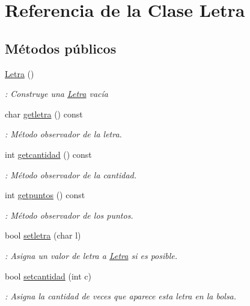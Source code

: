 \hypertarget{classLetra}{}\section{Referencia de la Clase Letra}
\label{classLetra}
\subsection*{Métodos públicos}
\begin{DoxyCompactItemize}
\item 
\hyperlink{classLetra_a2e236c67e3630258c6d3d9f2a9e66709}{Letra} ()\hypertarget{classLetra_a2e236c67e3630258c6d3d9f2a9e66709}{}\label{classLetra_a2e236c67e3630258c6d3d9f2a9e66709}

\begin{DoxyCompactList}\small\item\em \+: Construye una \hyperlink{classLetra}{Letra} vacía \end{DoxyCompactList}\item 
char \hyperlink{classLetra_a94a87e5d27e65cbc29c9e3b9ec25c2ef}{getletra} () const 
\begin{DoxyCompactList}\small\item\em \+: Método observador de la letra. \end{DoxyCompactList}\item 
int \hyperlink{classLetra_a6da04e78e8394286cf344a5517eefe93}{getcantidad} () const 
\begin{DoxyCompactList}\small\item\em \+: Método observador de la cantidad. \end{DoxyCompactList}\item 
int \hyperlink{classLetra_a0d1289cbbaf1ac3cef3728169fc0635d}{getpuntos} () const 
\begin{DoxyCompactList}\small\item\em \+: Método observador de los puntos. \end{DoxyCompactList}\item 
bool \hyperlink{classLetra_a60bee0a9f4fd060146a9bc6711d728c4}{setletra} (char l)
\begin{DoxyCompactList}\small\item\em \+: Asigna un valor de letra a \hyperlink{classLetra}{Letra} si es posible. \end{DoxyCompactList}\item 
bool \hyperlink{classLetra_a89680a16e9ab48e9ed0d6dee52cae82e}{setcantidad} (int c)
\begin{DoxyCompactList}\small\item\em \+: Asigna la cantidad de veces que aparece esta letra en la bolsa. \end{DoxyCompactList}\item 

\end{DoxyCompactItemize}

